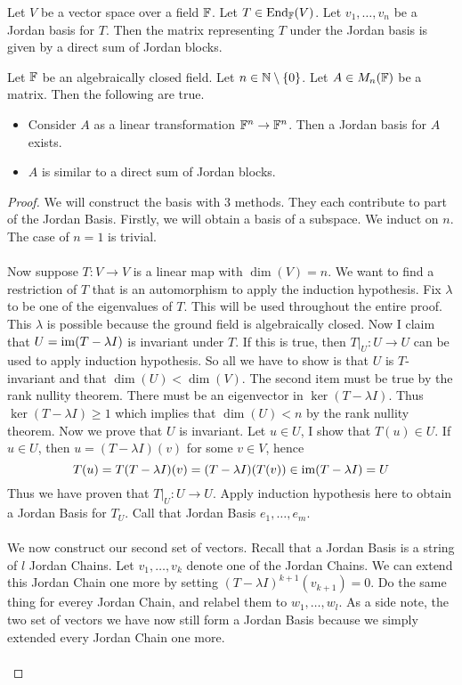 \documentclass[a4paper]{article}
\begin{document}
\begin{prp}{}{} Let $V$ be a vector space over a field $\mathbb{F}$. Let $T\in\text{End}_{\mathbb{F}}(V)$. Let $v_1,\dots,v_n$ be a Jordan basis for $T$. Then the matrix representing $T$ under the Jordan basis is given by a direct sum of Jordan blocks. 
\end{prp}

\begin{thm}{}{} Let $\mathbb{F}$ be an algebraically closed field. Let $n\in\mathbb{N}\setminus\{0\}$. Let $A\in M_n(\mathbb{F})$ be a matrix. Then the following are true. 
\begin{itemize}
\item Consider $A$ as a linear transformation $\mathbb{F}^n\to\mathbb{F}^n$. Then a Jordan basis for $A$ exists. 
\item $A$ is similar to a direct sum of Jordan blocks. 
\end{itemize} \tcbline
\begin{proof} We will construct the basis with $3$ methods. They each contribute to part of the Jordan Basis. Firstly, we will obtain a basis of a subspace. We induct on $n$. The case of $n=1$ is trivial. \\~\\
Now suppose $T:V\to V$ is a linear map with $\dim(V)=n$. We want to find a restriction of $T$ that is an automorphism to apply the induction hypothesis. Fix $\lambda$ to be one of the eigenvalues of $T$. This will be used throughout the entire proof. This $\lambda$ is possible because the ground field is algebraically closed. Now I claim that $U=\operatorname{im}(T-\lambda I)$ is invariant under $T$. If this is true, then $T|_U:U\to U$ can be used to apply induction hypothesis. So all we have to show is that $U$ is $T$-invariant and that $\dim(U)<\dim(V)$. The second item must be true by the rank nullity theorem. There must be an eigenvector in $\ker(T-\lambda I)$. Thus $\ker(T-\lambda I)\geq 1$ which implies that $\dim(U)<n$ by the rank nullity theorem. Now we prove that $U$ is invariant. Let $u\in U$, I show that $T(u)\in U$. If $u\in U$, then $u=(T-\lambda I)(v)$ for some $v\in V$, hence $$T(u)=T(T-\lambda I)(v)=(T-\lambda I)(T(v))\in\operatorname{im}(T-\lambda I)=U$$ Thus we have proven that $T|_U:U\to U$. Apply induction hypothesis here to obtain a Jordan Basis for $T_U$. Call that Jordan Basis $e_1,\dots,e_m$. \\~\\
We now construct our second set of vectors. Recall that a Jordan Basis is a string of $l$ Jordan Chains. Let $v_1,\dots,v_k$ denote one of the Jordan Chains. We can extend this Jordan Chain one more by setting $(T-\lambda I)^{k+1}(v_{k+1})=0$. Do the same thing for everey Jordan Chain, and relabel them to $w_1,\dots,w_l$. As a side note, the two set of vectors we have now still form a Jordan Basis because we simply extended every Jordan Chain one more. \\~\\

\end{proof}
\end{thm}
\end{document}

